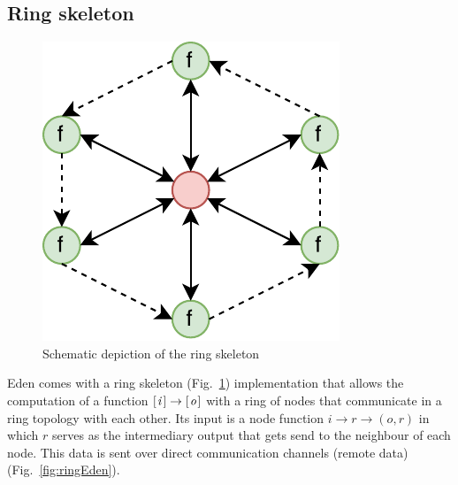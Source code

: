 \documentclass{jfp1}
\newcommand{\Varid}[1]{\mathit{#1}}
\begin{document}
\subsection{Ring skeleton} \label{sec:ring}
\begin{figure}[h]
	\includegraphics[scale=0.75]{images/ring}
	\caption{Schematic depiction of the ring skeleton}
	\label{fig:ringImg}
\end{figure}
Eden comes with a ring skeleton (Fig.~\ref{fig:ringImg}) implementation that allows the computation of a function \ensuremath{[\mskip1.5mu \Varid{i}\mskip1.5mu]\to [\mskip1.5mu \Varid{o}\mskip1.5mu]} with a ring of nodes that communicate in a ring topology with each other. Its input is a node function \ensuremath{\Varid{i}\to \Varid{r}\to (\Varid{o},\Varid{r})} in which \ensuremath{\Varid{r}} serves as the intermediary output that gets send to the neighbour of each node. This data is sent over direct communication channels (remote data) (Fig.~\ref{fig:ringEden}).
\end{document}
